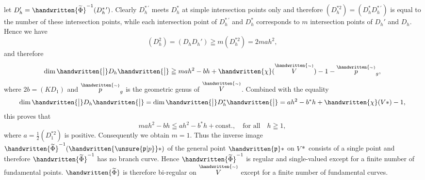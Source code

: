 
let $D_h'=\handwritten{\widetilde{\Phi}}^{-1}(D_h^{*\,\prime})$. Clearly $D_h^{*\,\prime}$ meets $D_h^{*}$ at simple intersection points only and therefore $(D_h^{*2})=(D_h^{*}D_h^{*\,\prime})$ is equal to the number of these intersection points, while each intersection point of $D_h^{*\,\prime}$ and $D_h^{*}$ corresponds to $m$ intersection points of $D_h'$ and $D_h$. Hence we have
\[
(D_h^2)=(D_hD_h')\geqq m(D_h^{*2})=2mah^2,
\]
and therefore
\[
\dim\handwritten{\big|}D_h\handwritten{\big|}\geqq mah^2-bh+\handwritten{\chi}(\overset{\handwritten{\scriptscriptstyle\sim}}{V})-1-\overset{\handwritten{\scriptscriptstyle\sim}}{p}_g,
\]
where $2b=(KD_1)$ and $\overset{\handwritten{\scriptscriptstyle\sim}}{p}_g$ is the geometric genus of $\overset{\handwritten{\scriptscriptstyle\sim}}{V}$. Combined with the equality
\[
\dim\handwritten{\big|}D_h\handwritten{\big|}=\dim\handwritten{\big|}D_h^{*}\handwritten{\big|}=ah^2-b^{*}h+\handwritten{\chi}(V*)-1,
\]
this proves that
\[
mah^2-bh\leqq ah^2-b^{*}h+\mathrm{const.},\quad\text{for all}\quad h\geqq1,
\]
where $a=\frac12(D_1^{*2})$ is positive. Consequently we obtain $m=1$. Thus the inverse image $\handwritten{\widetilde{\Phi}}^{-1}(\handwritten{\unsure{\mathfrak p|p}}*)$ of the general point $\handwritten{\mathfrak p}*$ on $V*$ consists of a single point and therefore $\handwritten{\widetilde{\Phi}}^{-1}$ has no branch curve. Hence $\handwritten{\widetilde{\Phi}}^{-1}$ is regular and single-valued except for a finite number of fundamental points. $\handwritten{\widetilde{\Phi}}$ is therefore bi-regular on $\overset{\handwritten{\scriptscriptstyle\sim}}{V}$ except for a finite number of fundamental curves.

